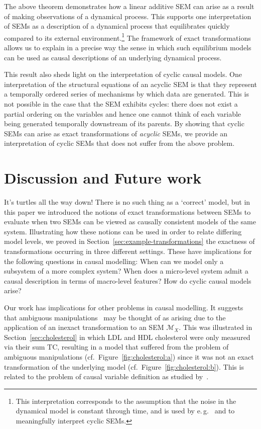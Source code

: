 The above theorem demonstrates how a linear additive SEM can arise as a result of making observations of a dynamical process.
This supports one interpretation of SEMs as a description of a dynamical process that equilibrates quickly compared to its external environment.\footnote{This interpretation corresponds to the assumption that the noise in the dynamical model is constant through time, and is used by e.\,g.\ \cite{lacerda2012discovering,Mooij_et_al_NIPS_11,hyttinen2012learning,mooij2013ode} and \cite{mooij2013cyclic} to meaningfully interpret cyclic SEMs.}
The framework of exact transformations allows us to explain in a precise way the sense in which such equilibrium models can be used as causal descriptions of an underlying dynamical process.

This result also sheds light on the interpretation of cyclic causal models.
One interpretation of the structural equations of an acyclic SEM is that they represent a temporally ordered series of mechanisms by which data are generated.
This is not possible in the case that the SEM exhibits cycles: there does not exist a partial ordering on the variables and hence one cannot think of each variable being generated temporally downstream of its parents.
By showing that cyclic SEMs can arise as exact transformations of \emph{acyclic} SEMs, we provide an interpretation of cyclic SEMs that does not suffer from the above problem.

\section{Discussion and Future work}\label{sec:questions}

It's turtles all the way down!
There is no such thing as a `correct' model, but in this paper we introduced the notions of exact transformations between SEMs to evaluate when two SEMs can be viewed as causally consistent models of the same system.
Illustrating how these notions can be used in order to relate differing model levels, we proved in Section~\ref{sec:example-transformations} the exactness of transformations occurring in three different settings.
These have implications for the following questions in causal modelling: When can we model only a subsystem of a more complex system? When does a micro-level system admit a causal description in terms of macro-level features? How do cyclic causal models arise?


Our work has implications for other problems in causal modelling.
It suggests that ambiguous manipulations~\citep{spirtes2004causal} may be thought of as arising due to the application of an inexact transformation to an SEM $\mathcal{M}_X$.
This was illustrated in Section~\ref{sec:cholesterol} in which LDL and HDL cholesterol were only measured via their sum TC, resulting in a model that suffered from the problem of ambiguous manipulations (cf.\ Figure~\ref{fig:cholesterol:a}) since it was not an exact transformation of the underlying model (cf.\ Figure~\ref{fig:cholesterol:b}).
This is related to the problem of causal variable definition as studied by~\cite{eberhardt2016green}.

